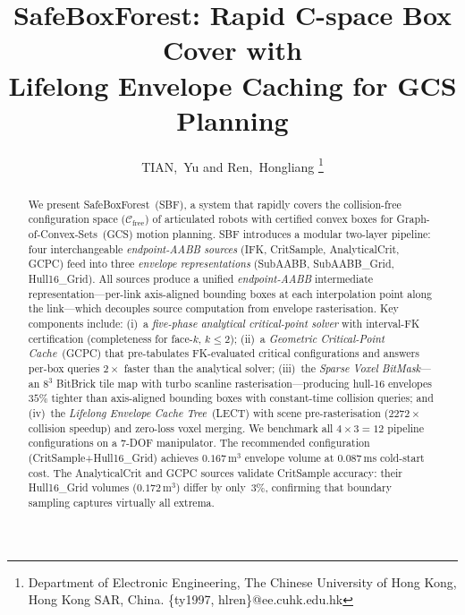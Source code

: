 \documentclass[journal]{IEEEtran}
\newcommand{\Cfree}{\mathcal{C}_\text{free}}
\begin{document}
\title{SafeBoxForest: Rapid C-space Box Cover with\\
Lifelong Envelope Caching for GCS Planning}

\author{
  TIAN,~Yu and Ren,~Hongliang
  \thanks{Department of Electronic Engineering,
  The Chinese University of Hong Kong, Hong Kong SAR, China.
  \{ty1997, hlren\}@ee.cuhk.edu.hk}
}


\maketitle

\begin{abstract}
We present SafeBoxForest~(SBF), a system that rapidly
covers the collision-free configuration space ($\Cfree$) of
articulated robots with certified convex boxes
for Graph-of-Convex-Sets~(GCS) motion planning.
SBF introduces a modular two-layer pipeline:
four interchangeable \emph{endpoint-AABB sources}
(IFK, CritSample, AnalyticalCrit, GCPC)
feed into three \emph{envelope representations}
(SubAABB, SubAABB\_Grid, Hull16\_Grid).
All sources produce a unified \emph{endpoint-AABB} intermediate
representation---per-link axis-aligned bounding boxes at each
interpolation point along the link---which decouples
source computation from envelope rasterisation.
Key components include:
(i)~a \emph{five-phase analytical critical-point solver}
with interval-FK certification (completeness for face-$k$, $k \leq 2$);
(ii)~a \emph{Geometric Critical-Point Cache}~(GCPC) that
pre-tabulates FK-evaluated critical configurations and
answers per-box queries $2{\times}$ faster than the analytical solver;
(iii)~the \emph{Sparse Voxel BitMask}---an $8^3$ BitBrick
tile map with turbo scanline rasterisation---producing
hull-16 envelopes $35\%$ tighter than axis-aligned bounding
boxes with constant-time collision queries; and
(iv)~the \emph{Lifelong Envelope Cache Tree}~(LECT)
with scene pre-rasterisation ($2272{\times}$ collision speedup)
and zero-loss voxel merging.
We benchmark all $4{\times}3{=}12$ pipeline configurations on a
7-DOF manipulator.
The recommended configuration (CritSample+Hull16\_Grid)
achieves $0.167$\,m$^3$ envelope volume at $0.087$\,ms
cold-start cost.
The AnalyticalCrit and GCPC sources validate CritSample
accuracy: their Hull16\_Grid volumes ($0.172$\,m$^3$) differ
by only~$3\%$, confirming that boundary sampling captures
virtually all extrema.
\end{abstract}
\end{document}
